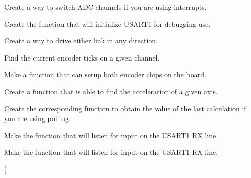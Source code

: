 
\begin{DoxyRefList}
\item[\label{todo__todo000003}%
\hypertarget{todo__todo000003}{}%
Global \hyperlink{_a_d_c_8c_a8174ca24b578eaf4f82f44d6ce44edb0}{change\-A\-D\-C} (int channel)]Create a way to switch A\-D\-C channels if you are using interrupts.  
\item[\label{todo__todo000024}%
\hypertarget{todo__todo000024}{}%
Global \hyperlink{_u_s_a_r_t_debug_8c_a9a96eb5e6b5a13fff8ed69716e76a314}{debug\-U\-S\-A\-R\-T\-Init} (unsigned long baudrate)]Create the function that will initialize U\-S\-A\-R\-T1 for debugging use.  
\item[\label{todo__todo000008}%
\hypertarget{todo__todo000008}{}%
Global \hyperlink{motors_8h_af4a8cb121ce437984322ade3672082d2}{drive\-Link} (int link, int dir)]Create a way to drive either link in any direction.  
\item[\label{todo__todo000014}%
\hypertarget{todo__todo000014}{}%
Global \hyperlink{_periph_8h_a6c804bfcd9e9943d093395f535a3b672}{enc\-Count} (int chan)]Find the current encoder ticks on a given channel.  
\item[\label{todo__todo000012}%
\hypertarget{todo__todo000012}{}%
Global \hyperlink{_periph_8h_a15de8c2dd97f966ce278ab793669adfd}{enc\-Init} (int chan)]Make a function that can setup both encoder chips on the board.  
\item[\label{todo__todo000010}%
\hypertarget{todo__todo000010}{}%
Global \hyperlink{_periph_8h_a664961c139fdb66c6fd0fb0e997df433}{get\-Accel} (int axis)]Create a function that is able to find the acceleration of a given axis.  
\item[\label{todo__todo000002}%
\hypertarget{todo__todo000002}{}%
Global \hyperlink{_a_d_c_8c_a9f560657fb624f98de3161651f3d4385}{get\-A\-D\-C} (int channel)]Create the corresponding function to obtain the value of the last calculation if you are using polling.  
\item[\label{todo__todo000026}%
\hypertarget{todo__todo000026}{}%
Global \hyperlink{_u_s_a_r_t_debug_8c_a6653563b8e7c5134da2d944ff8ef2f73}{get\-Char\-Debug} ()]Make the function that will listen for input on the U\-S\-A\-R\-T1 R\-X line.  
\item[\label{todo__todo000026}%
\hypertarget{todo__todo000026}{}%
Global \hyperlink{_u_s_a_r_t_debug_8c_a6653563b8e7c5134da2d944ff8ef2f73}{get\-Char\-Debug} ()]Make the function that will listen for input on the U\-S\-A\-R\-T1 R\-X line.  
\item[\label{todo__todo000017}%

\end{DoxyRefList}
